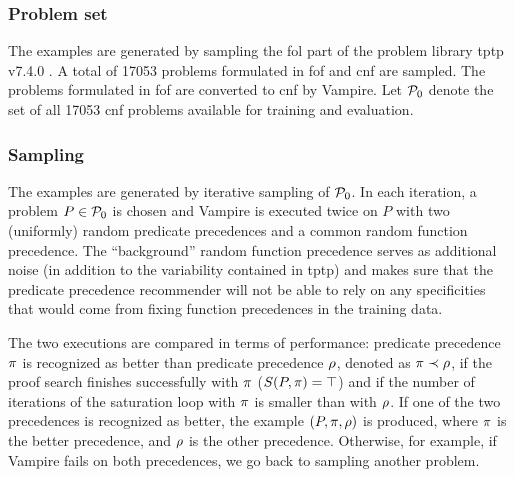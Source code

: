\subsubsection{Problem set}


The examples are generated by sampling the \gls{fol} part of the problem library \gls{tptp} v7.4.0 \cite{10.1007/978-3-030-29436-6_29}.
A total of \num{17053} problems formulated in \gls{fof} and \gls{cnf} are sampled.
The problems formulated in \gls{fof} are converted to \gls{cnf} by Vampire.
Let $\operatorname{\mathcal{P}_{0}}$ denote the set of all \num{17053} \gls{cnf} problems available for training and evaluation.

\subsubsection{Sampling}

The examples are generated by iterative sampling of $\operatorname{\mathcal{P}_{0}}$.
In each iteration, a problem $P \in \operatorname{\mathcal{P}_{0}}$ is chosen and Vampire is executed twice on $P$
with two (uniformly) random predicate precedences and a common random function precedence.
The ``background'' random function precedence serves as additional noise (in addition to the variability 
contained in \gls{tptp}) and makes sure that the predicate precedence recommender
will not be able to rely on any specificities that would come from fixing function precedences in the training data.

The two executions are compared in terms of performance:
predicate precedence $\pi$ is recognized as better than predicate precedence $\rho$,
denoted as $\pi \prec \rho$,
if the proof search finishes successfully with $\pi$ ($S(P, \pi) = \top$)
and if the number of iterations of the saturation loop with $\pi$ is smaller than with $\rho$.
If one of the two precedences is recognized as better,
the example $(P, \pi, \rho)$ is produced,
where $\pi$ is the better precedence,
and $\rho$ is the other precedence.
Otherwise, for example, if Vampire fails on both precedences, we go back to sampling another problem.


